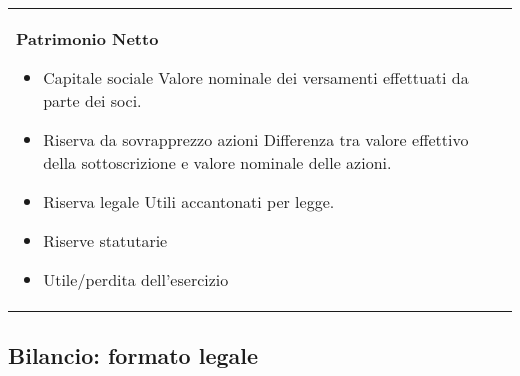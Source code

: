 \documentclass[a4paper,portrait,12pt]{article}
\theoremstyle{definition}
\begin{document}
\begin{table}[H]
\begin{center}
\begin{tabular}{ll}
\begin{minipage}[t]{.5\linewidth}
\textbf{Patrimonio Netto}
\begin{itemize}
\item Capitale sociale
Valore nominale dei versamenti effettuati da parte dei soci.
\item Riserva da sovrapprezzo azioni
Differenza tra valore effettivo della sottoscrizione e valore 
nominale delle azioni.
\item Riserva legale
Utili accantonati per legge.
\item Riserve statutarie
\item Utile/perdita dell’esercizio
\end{itemize}
\end{minipage}
\end{tabular}
\end{center}
\end{table}


\subsection{Bilancio: formato legale}
\end{document}
